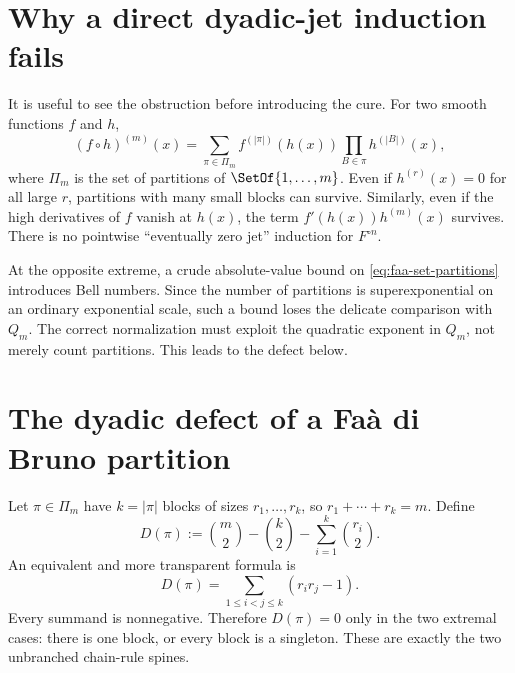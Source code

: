 \documentclass[11pt,oneside]{article}
\theoremstyle{definition}
\theoremstyle{remark}
\newcommand{\comp}{\mathbin{\circ}}
\begin{document}
\section{Why a direct dyadic-jet induction fails}

It is useful to see the obstruction before introducing the cure.  For two smooth
functions $f$ and $h$,
\begin{equation}
 (f\comp h)^{(m)}(x)
 =\sum_{\pi\in\Pi_m}
 f^{(|\pi|)}(h(x))\prod_{B\in\pi}h^{(|B|)}(x),
 \label{eq:faa-set-partitions}
\end{equation}
where $\Pi_m$ is the set of partitions of $\SetOf{1,\ldots,m}$.  Even if
$h^{(r)}(x)=0$ for all large $r$, partitions with many small blocks can survive.
Similarly, even if the high derivatives of $f$ vanish at $h(x)$, the term
$f'(h(x))h^{(m)}(x)$ survives.  There is no pointwise ``eventually zero jet''
induction for $F^{\comp n}$.

At the opposite extreme, a crude absolute-value bound on \eqref{eq:faa-set-partitions}
introduces Bell numbers.  Since the number of partitions is superexponential on an
ordinary exponential scale, such a bound loses the delicate comparison with $Q_m$.
The correct normalization must exploit the quadratic exponent in $Q_m$, not merely
count partitions.  This leads to the defect below.

\section{The dyadic defect of a Fa\`a di Bruno partition}
\label{sec:defect}

Let $\pi\in\Pi_m$ have $k=|\pi|$ blocks of sizes
$r_1,\ldots,r_k$, so $r_1+\cdots+r_k=m$.  Define
\begin{equation}
 D(\pi):=\binom m2-\binom k2-\sum_{i=1}^k\binom{r_i}{2}.
 \label{eq:defect}
\end{equation}
An equivalent and more transparent formula is
\begin{equation}
 D(\pi)=\sum_{1\leq i<j\leq k}(r_ir_j-1).
 \label{eq:defect-pairs}
\end{equation}
Every summand is nonnegative.  Therefore $D(\pi)=0$ only in the two extremal cases:
there is one block, or every block is a singleton.  These are exactly the two
unbranched chain-rule spines.
\end{document}
